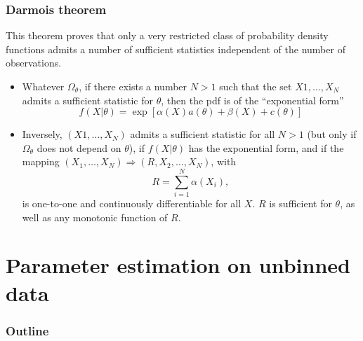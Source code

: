 \documentclass[9pt]{beamer}
\begin{document}
\begin{frame}
 \frametitle{Darmois theorem}
 
 This theorem proves that only a very restricted class of probability density functions admits a number of sufficient statistics independent of the number of observations.
 
 \begin{itemize}
  \item<2-> Whatever $\Omega_\theta$, if there exists a number $N>1$ such that the set $X1,\dots,X_N$ admits a sufficient statistic for $\theta$, then the pdf is of the ``exponential form''
  $$f(X|\theta) = \exp [ \alpha(X)a(\theta) + \beta(X) + c(\theta)]$$
  \item<3> Inversely, $(X1,\dots,X_N)$ admits a sufficient statistic for all $N>1$ (but only if $\Omega_\theta$ does not depend on $\theta$), if $f(X|\theta)$ has the exponential form,
  and if the mapping $(X_1,\dots,X_N) \Rightarrow (R,X_2,\dots,X_N)$, with
  $$R = \sum_{i=1}^N \alpha(X_i),$$
  is one-to-one and continuously differentiable for all $X$. $R$ is sufficient for $\theta$, as well as any monotonic function of $R$.
 \end{itemize}

\end{frame}



\section{Parameter estimation on unbinned data}

\begin{frame}
 \frametitle{Outline}
 
 \tableofcontents[current]
\end{frame}
\end{document}
